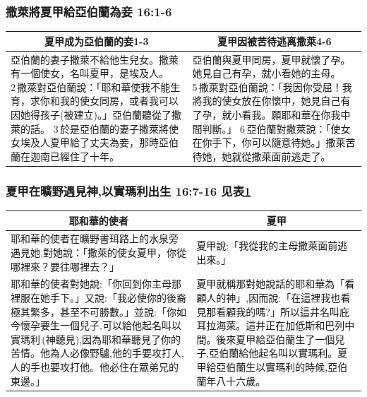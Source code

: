 \subsubsection{撒萊將夏甲給亞伯蘭為妾 16:1-6 }
\label{sec:SaLaiGiveXiaJiaWeiQie}

\begin{table}[H]
\centering
\begin{tabular}{p{8.75cm}|p{8.50cm}}\hline\hline
\multicolumn{1}{c|}{夏甲成为亞伯蘭的妾1-3}&\multicolumn{1}{c}{夏甲因被苦待逃离撒萊4-6}\\\hline
亞伯蘭的妻子撒萊不給他生兒女。撒萊有一個使女，名叫夏甲，是埃及人。 2 撒萊對亞伯蘭說：「耶和華使我不能生育，求你和我的使女同房，或者我可以因她得孩子(被建立)。」亞伯蘭聽從了撒萊的話。 3 於是亞伯蘭的妻子撒萊將使女埃及人夏甲給了丈夫為妾，那時亞伯蘭在迦南已經住了十年。
&亞伯蘭與夏甲同房，夏甲就懷了孕。她見自己有孕，就小看她的主母。 5 撒萊對亞伯蘭說：「我因你受屈！我將我的使女放在你懷中，她見自己有了孕，就小看我。願耶和華在你我中間判斷。」 6 亞伯蘭對撒萊說：「使女在你手下，你可以隨意待她。」撒萊苦待她，她就從撒萊面前逃走了。
\\\hline
\end{tabular}
\end{table}


\subsubsection{夏甲在曠野遇見神,以實瑪利出生 16:7-16 见表\ref{table:GodYuXiaJia}}
\label{sec:XiaJiaYuGod}
\begin{table}[H]
\centering
\begin{tabular}{p{9cm}|p{8.250cm}}\hline\hline
\multicolumn{1}{c|}{耶和華的使者}&\multicolumn{1}{c}{夏甲}\\\hline
耶和華的使者在曠野書珥路上的水泉旁遇見她,對她說：「撒萊的使女夏甲，你從哪裡來？要往哪裡去？」
&夏甲說:「我從我的主母撒萊面前逃出來。」\\\hline
耶和華的使者對她說:「你回到你主母那裡服在她手下。」又說:「我必使你的後裔極其繁多，甚至不可勝數。」並說:「你如今懷孕要生一個兒子,可以給他起名叫以實瑪利 (神聽見),因為耶和華聽見了你的苦情。他為人必像野驢,他的手要攻打人,人的手也要攻打他。他必住在眾弟兄的東邊。」
&夏甲就稱那對她說話的耶和華為「看顧人的神」,因而說:「在這裡我也看見那看顧我的嗎?」所以這井名叫庇耳拉海萊。這井正在加低斯和巴列中間。後來夏甲給亞伯蘭生了一個兒子,亞伯蘭給他起名叫以實瑪利。夏甲給亞伯蘭生以實瑪利的時候,亞伯蘭年八十六歲。\\\hline
\end{tabular}
\label{table:GodYuXiaJia}
\end{table}

